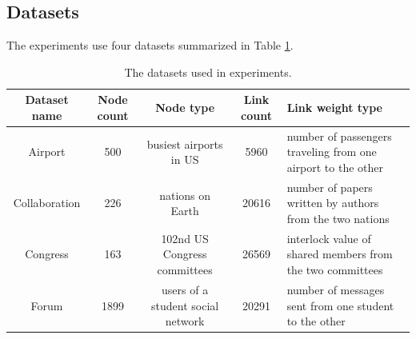 \documentclass[conference]{IEEEtran}
\begin{document}
\subsection{Datasets}
The experiments use four datasets summarized in Table \ref{tab:datasets}.
\begin{table}[!htb]\centering
	\caption{The datasets used in experiments.}
	\begin{tabularx}{\textwidth}{|c|c|c|c|X|}  \hline \rowcolor{blue!40}
		Dataset name & Node count & Node type & Link count & Link weight type \\ \hline
		Airport\cite{colizza2007reaction} & 500 & busiest airports in US & 5960 & number of passengers traveling from one airport to the other\\ \hline
		Collaboration\cite{pan2012world} & 226 & nations on Earth & 20616 & number of papers written by authors from the two nations \\ \hline
		Congress\cite{porter2005network} & 163  & 102nd US Congress committees & 26569 & interlock value of shared members from the two committees \\ \hline
		Forum\cite{opsahl2009clustering}  & 1899 & users of a student social network & 20291 & number of messages sent from one student to the other \\ \hline
	\end{tabularx}
	\label{tab:datasets}
\end{table}
\end{document}

